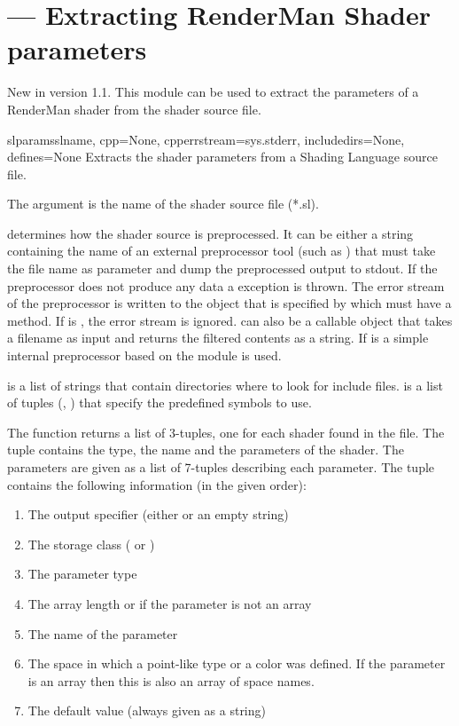 \section{ ---
          Extracting RenderMan Shader parameters}
\label{slparams}


New in version 1.1. This module can be used to extract the parameters
of a RenderMan shader from the shader source file.

\begin{funcdesc}{slparams}{slname, cpp=None, cpperrstream=sys.stderr, includedirs=None, defines=None}
Extracts the shader parameters from a Shading Language source file. 

The argument  is the name of the shader source file
(*.sl). 

 determines how the shader source is preprocessed. It can be
either a string containing the name of an external preprocessor tool
(such as ) that must take the file name as parameter and
dump the preprocessed output to stdout. If the preprocessor does not
produce any data a  exception is
thrown. The error stream of the preprocessor is written to the object
that is specified by  which must have a
 method. If  is , the error 
stream is ignored.  can also be a callable object that takes a
filename as input and returns the filtered contents as a string. If
 is  a simple internal preprocessor based on the 
 module is used.

 is a list of strings that contain directories where to 
look for include files.  is a list of tuples (,
) that specify the predefined symbols to use.

The function returns a list of 3-tuples, one for each shader found in
the file. The tuple contains the type, the name and the parameters of
the shader. The parameters are given as a list of 7-tuples describing
each parameter. The tuple contains the following information (in the
given order):

\begin{enumerate}
\item The output specifier (either  or an empty string) 
\item The storage class ( or ) 
\item The parameter type 
\item The array length or  if the parameter is not an array 
\item The name of the parameter 
\item The space in which a point-like type or a color was defined. If the parameter is an array then this is also an array of space names. 
\item The default value (always given as a string)
\end{enumerate}


\end{funcdesc}
